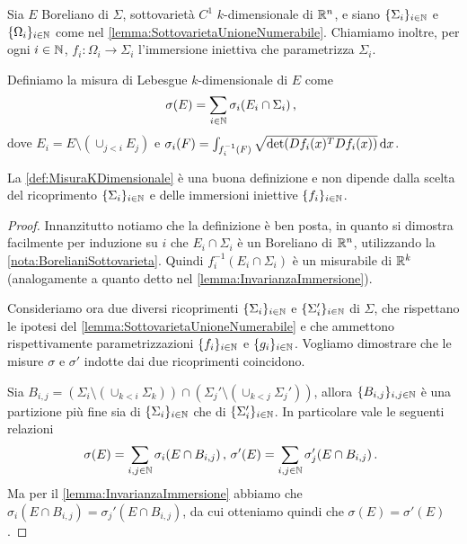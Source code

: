 \begin{definition}\label{def:MisuraKDimensionale}
	Sia $E$ Boreliano di $\Sigma$, sottovarietà $C^1$ $k$-dimensionale di $\mathbb R^n$, e siano $\{\Sigma_i\}_{i\in\mathbb N}$ e $\{\Omega_i\}_{i\in\mathbb N}$ come nel \cref{lemma:SottovarietaUnioneNumerabile}. Chiamiamo inoltre, per ogni $i\in\mathbb N$, $f_i:\Omega_i\to\Sigma_i$ l'immersione iniettiva che parametrizza $\Sigma_i$.
	
	Definiamo la misura di Lebesgue $k$-dimensionale di $E$ come
	\begin{equation*}
		\sigma(E)=\sum_{i\in\mathbb N} \sigma_i(E_i\cap \Sigma_i)\, \text{, }
	\end{equation*}
	dove $E_i=E\setminus (\cup_{j<i}E_j)$ e $\sigma_i(F)=\int_{f_i^{-1}(F)}\sqrt{\det(Df_i(x)^TDf_i(x))} \,\mathrm d x$.
\end{definition}
\begin{theorem}
	La \cref{def:MisuraKDimensionale} è una buona definizione e non dipende dalla scelta del ricoprimento $\{\Sigma_i\}_{i\in\mathbb N}$ e delle immersioni iniettive $\{f_i\}_{i\in\mathbb N}$.
\end{theorem}
\begin{proof}
	Innanzitutto notiamo che la definizione è ben posta, in quanto si dimostra facilmente per induzione su $i$ che $E_i\cap\Sigma_i$ è un Boreliano di $\mathbb R^n$, utilizzando la \cref{nota:BorelianiSottovarieta}. Quindi $f_i^{-1}(E_i\cap\Sigma_i)$ è un misurabile di $\mathbb R^k$ (analogamente a quanto detto nel \cref{lemma:InvarianzaImmersione}).

	Consideriamo ora due diversi ricoprimenti $\{\Sigma_i\}_{i\in\mathbb N}$ e $\{\Sigma_i'\}_{i\in\mathbb N}$ di $\Sigma$, che rispettano le ipotesi del \cref{lemma:SottovarietaUnioneNumerabile} e che ammettono rispettivamente parametrizzazioni $\{f_i\}_{i\in\mathbb N}$ e $\{g_i\}_{i\in\mathbb N}$. Vogliamo dimostrare che le misure $\sigma$ e $\sigma'$ indotte dai due ricoprimenti coincidono.
	
	Sia $B_{i,j}=(\Sigma_i\setminus (\cup_{k<i}\Sigma_k))\cap (\Sigma_j'\setminus (\cup_{k<j}\Sigma_j'))$, allora $\{B_{i,j}\}_{i,j\in\mathbb N}$ è una partizione più fine sia di $\{\Sigma_i\}_{i\in\mathbb N}$ che di $\{\Sigma_i'\}_{i\in\mathbb N}$. In particolare vale le seguenti relazioni
	\begin{equation*}
		\sigma(E)=\sum_{i,j\in\mathbb N} \sigma_i(E\cap B_{i,j})\, \text{, } \sigma'(E)=\sum_{i,j\in\mathbb N} \sigma_j'(E\cap B_{i,j})\, \text{. }
	\end{equation*}
	Ma per il \cref{lemma:InvarianzaImmersione} abbiamo che $\sigma_i(E\cap B_{i,j})=\sigma_j'(E\cap B_{i,j})$, da cui otteniamo quindi che $\sigma(E)=\sigma'(E)$.

\end{proof}





